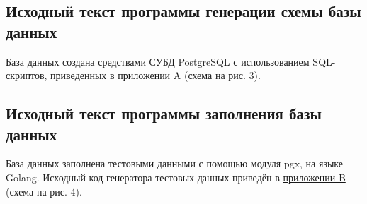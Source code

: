 \subsection{Исходный текст программы генерации схемы базы данных}

База данных создана средствами СУБД PostgreSQL с использованием SQL-скриптов, приведенных в \hyperref[app:A]{приложении A} (схема на рис. 3).

\subsection{Исходный текст программы заполнения базы данных}
База данных заполнена тестовыми данными с помощью модуля pgx, на языке Golang. Исходный код генератора тестовых данных приведён в \hyperref[app:B]{приложении B} (схема на рис. 4).

\newpage
